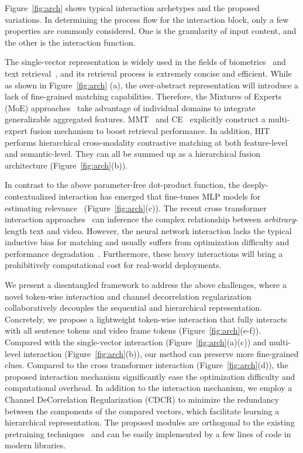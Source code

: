 \documentclass[runningheads]{llncs}
\begin{document}
Figure~\ref{fig:arch} shows typical interaction archetypes and the proposed variations.
In determining the process flow for the interaction block, only a few properties are commonly considered. 
One is the granularity of input content, and the other is the interaction function.

The single-vector representation is widely used in the fields of biometrics~\cite{arcface,reid} and text retrieval~\cite{dssm}, and its retrieval process is extremely concise and efficient.
While as shown in Figure~\ref{fig:arch} (a), the over-abstract representation will introduce a lack of fine-grained matching capabilities.
Therefore, the Mixtures of Experts (MoE) approaches~\cite{ce,mmt,hit} take advantage of individual domains to integrate generalizable aggregated features.
MMT~\cite{mmt} and CE~\cite{ce} explicitly construct a multi-expert fusion mechanism to boost retrieval performance.
In addition, HIT~\cite{hit} performs hierarchical cross-modality contrastive matching at both feature-level and semantic-level. They can all be summed up as a hierarchical fusion architecture (Figure~\ref{fig:arch}(b)).

In contrast to the above parameter-free dot-product function, the deeply-contextualized interaction has emerged that fine-tunes MLP models for estimating relevance~\cite{spm,jsfusion} (Figure~\ref{fig:arch}(c)).
The recent cross transformer interaction approaches~\cite{hero,clip4clip} can inference the complex relationship between \textit{arbitrary}-length text and video. 
However, the neural network interaction lacks the typical inductive bias for matching and usually suffers from optimization difficulty and performance degradation~\cite{clip4clip}.
Furthermore, these heavy interactions will bring a prohibitively computational cost for real-world deployments.

We present a disentangled framework to address the above challenges, where a novel token-wise interaction and channel decorrelation regularization collaboratively decouples the sequential and hierarchical representation. 
Concretely, we propose a lightweight token-wise interaction that fully interacts with all sentence tokens and video frame tokens (Figure~\ref{fig:arch}(e-f)). 
Compared with the single-vector interaction (Figure~\ref{fig:arch}(a)(c)) and multi-level interaction (Figure~\ref{fig:arch}(b)), our method can preserve more fine-grained clues.
Compared to the cross transformer interaction (Figure~\ref{fig:arch}(d)), the proposed interaction mechanism significantly ease the optimization difficulty and computational overhead.
In addition to the interaction mechanism, we employ a Channel DeCorrelation Regularization (CDCR) to minimize the redundancy between the components of the compared vectors, which facilitate learning a hierarchical representation.
The proposed modules are orthogonal to the existing pretraining techniques~\cite{hero,clipbert,oscar,univl,frozen} and can be easily implemented by a few lines of code in modern libraries.
\end{document}
